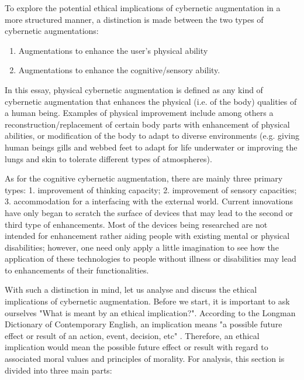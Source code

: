 To explore the potential ethical implications of cybernetic augmentation in a more structured manner, a distinction is made between the two types of cybernetic augmentations: 
\begin{enumerate}
	\item Augmentations to enhance the user's physical ability
	\item Augmentations to enhance the cognitive/sensory ability.
\end{enumerate}

In this essay, physical cybernetic augmentation is defined as any kind of cybernetic augmentation that enhances the physical (i.e. of the body) qualities of a human being. Examples of physical improvement include among others a reconstruction/replacement of certain body parts with enhancement of physical abilities, or modification of the body to adapt to diverse environments (e.g. giving human beings gills and webbed feet to adapt for life underwater or improving the lungs and skin to tolerate different types of atmospheres).

As for the cognitive cybernetic augmentation, there are mainly three primary types: 1. improvement of thinking capacity; 2. improvement of sensory capacities; 3. accommodation for a interfacing with the external world. Current innovations have only began to scratch the surface of devices that may lead to the second or third type of enhancements. Most of the devices being researched are not intended for enhancement rather aiding people with existing mental or physical disabilities; however, one need only apply a little imagination to see how the application of these technologies to people without illness or disabilities may lead to enhancements of their functionalities.


With such a distinction in mind, let us analyse and discuss the ethical implications of cybernetic augmentation. Before we start, it is important to ask ourselves "What is meant by an ethical implication?". According to the Longman Dictionary of Contemporary English, an implication means "a possible future effect or result of an action, event, decision, etc" \cite{Longman_dic}. Therefore, an ethical implication would mean the possible future effect or result with regard to associated moral values and principles of morality. For analysis, this section is divided into three main parts: 

